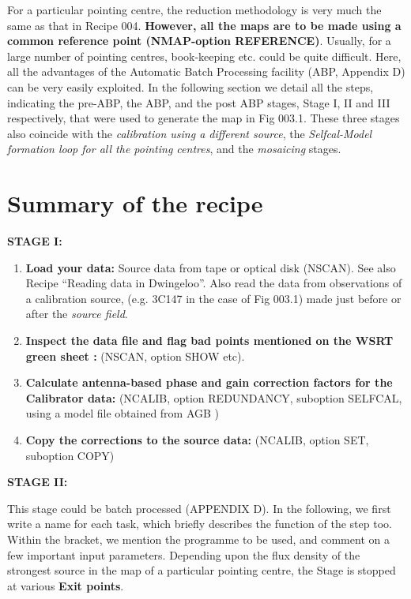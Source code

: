 For a particular pointing centre, the reduction methodology is very much the
same as that in Recipe 004. {\bf However, all the maps are to be made using a
common reference point (NMAP-option REFERENCE)}. Usually, for a large number of
pointing centres, book-keeping etc. could be quite difficult. Here, all the
advantages of the Automatic Batch Processing facility (ABP, Appendix D) can be
very easily exploited. In the  following section we detail all the steps,
indicating the pre-ABP, the ABP, and the post ABP stages, Stage I, II and III
respectively, that were used to generate the map in Fig 003.1. These three
stages also coincide with the {\em calibration using a different source}, the
{\em Selfcal-Model formation loop for all the pointing centres}, and the {\em
mosaicing} stages.


\section{Summary of the recipe}
\label{.summary}

{\bf STAGE I:}

\begin{enumerate}
\item {\bf Load your data:} Source data from tape or optical disk (NSCAN). See
also Recipe ``Reading data in Dwingeloo''. Also read the data from observations
of a calibration source, (e.g. 3C147 in the case of Fig 003.1) made just before
or after the {\em source field}.
\item {\bf Inspect the data file and flag bad points mentioned on the WSRT
green sheet :} (NSCAN, option SHOW etc).
\item {\bf Calculate antenna-based phase and gain correction factors for the
Calibrator data:} (NCALIB, option REDUNDANCY, suboption SELFCAL, using a model
file obtained from AGB )
\item {\bf Copy the corrections to the source data:} (NCALIB, option SET,
suboption COPY)
\end{enumerate}

{\bf STAGE II:}

This stage could be batch processed (APPENDIX D). In the following, we first
write a name for each task, which briefly describes the function of the step
too. Within the bracket, we mention the programme to be used, and comment on a
few important input parameters. Depending upon the flux density of the
strongest source in the map of a particular pointing centre, the Stage is
stopped at various {\bf Exit points}.

